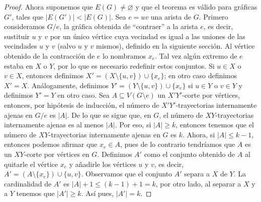 \begin{proof}
    Ahora suponemos que $E(G) \neq \varnothing$ y que el teorema es v\'alido
    para gr\'aficas $G'$, tales que $|E(G')| < |E(G)|$. Sea $e = uv$ una arista
    de $G$. Primero consideramos $G/e$, la gr\'afica obtenida de ``contraer'' a
    la arista $e$, es decir, sustituir $u$ y $v$ por un \'unico v\'ertice cuya
    vecindad es igual a las uniones de las vecindades $u$ y $v$ (salvo $u$ y $v$
    mismos), definido en la siguiente secci\'on. Al v\'ertice obtenido de la
    contracci\'on de $e$ lo nombramos $x_e$. Tal vez alg\'un extremo de $e$
    estaba en $X$ o $Y$, por lo que es necesario redefinir estos conjuntos. Si
    $u\in X$ o $v\in X$, entonces definimos $X'=(X \setminus \{u,v\}) \cup
    \{x_e\}$; en otro caso definimos $X'=X$. An\'alogamente, definimos $Y'= (Y
    \setminus \{u,v\}) \cup \{x_e\}$ si $u \in Y$ o $v \in Y$ y definimos $Y'=Y$
    en otro caso. Sea $A \subseteq V(G \setminus e)$ un $X'Y'$-corte por
    v\'ertices, entonces, por hip\'otesis de inducci\'on, el n\'umero de
    $X'Y'$-trayectorias internamente ajenas en $G/e$ es $|A|$. De lo que se
    sigue que, en $G$, el n\'umero de $XY$-trayectorias internamente ajenas es
    al menos $|A|$. Por eso, si $|A| \geq k$, entonces tenemos que el n\'umero
    de $XY$-trayectorias internamente ajenas en $G$ es $k$. Ahora, si $|A| \leq
    k-1$, entonces podemos afirmar que $x_e \in A$, pues de lo contrario
    tendr\'iamos que $A$ es un $XY$-corte por v\'ertices en $G$. Definimos $A'$
    como el conjunto obtenido de $A$ al quitarle el v\'ertice $x_e$ y
    a\~{n}adirle los v\'ertices $u$ y $v$, es decir, $A'=(A \setminus
    \{x_e\})\cup \{u,v\}$. Observamos que el conjunto $A'$ separa  a $X$ de $Y$.
    La cardinalidad de $A'$ es $|A|+1 \leq (k-1)+1= k$, por otro lado, al
    separar a $X$ y a $Y$ tenemos que $|A'| \geq k$. As\'i pues, $|A'|=k$.


\end{proof}
